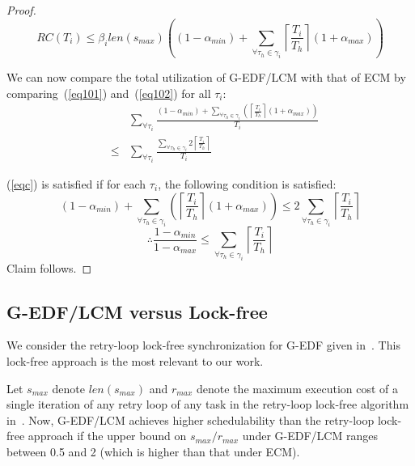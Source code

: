 \begin{proof}
\begin{equation}
RC(T_{i}) \le \beta_{i}len(s_{max}) \left((1-\alpha_{min}) + \sum_{\forall \tau_h \in \gamma_i}\left\lceil\frac{T_{i}}{T_{h}}\right\rceil(1+\alpha_{max})\right)
\label{eq102}\end{equation}

We can now compare the total utilization of G-EDF/LCM with that of ECM by comparing~(\ref{eq101}) and~(\ref{eq102}) for all $\tau_i$:
\begin{eqnarray}
& & \sum_{\forall \tau_{i}}\frac{(1-\alpha_{min})+\sum_{\forall \tau_{h}\in\gamma_{i}}\left(\left\lceil\frac{T_{i}}{T_{h}}\right\rceil(1+\alpha_{max})\right)}{T_{i}} \nonumber\\
& \le &   \sum_{\forall \tau_{i}}\frac{\sum_{\forall \tau_{h}\in\gamma_{i}}2\left\lceil\frac{T_{i}}{T_{h}}\right\rceil}{T_{i}}\label{eqc}\end{eqnarray}

(\ref{eqc}) is satisfied if for each $\tau_{i}$, the following condition is satisfied:
\begin{equation*}
(1-\alpha_{min})+\sum_{\forall \tau_h \in \gamma_i}\left(\left\lceil\frac{T_{i}}{T_{h}}\right\rceil(1+\alpha_{max})\right)  \le  2\sum_{\forall \tau_h \in \gamma_i}\left\lceil\frac{T_{i}}{T_{h}}\right\rceil
\end{equation*}
\begin{equation*}
\therefore\frac{1-\alpha_{min}}{1-\alpha_{max}}  \le  \sum_{\forall \tau_h \in \gamma_i}\left\lceil\frac{T_{i}}{T_{h}}\right\rceil
\end{equation*}
Claim follows.
\end{proof}


\subsection{G-EDF/LCM versus Lock-free}
\label{gedf-lcm-lock-free}
We consider the retry-loop lock-free synchronization for G-EDF given in~\cite{key-5}. This lock-free approach is the most relevant to our work. 

\begin{clm}\label{gedf-lcm-lock-free_clm} 
Let $s_{max}$ denote $len(s_{max})$ and $r_{max}$ denote the maximum execution cost of a single iteration of any retry loop of any task in the retry-loop lock-free algorithm in~\cite{key-5}. Now, G-EDF/LCM achieves higher schedulability than the retry-loop lock-free approach if the upper bound on $s_{max}/r_{max}$ under G-EDF/LCM ranges between 0.5 and 2 (which is higher than that under  ECM). 
\end{clm}

